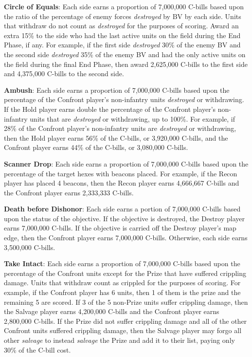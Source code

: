 \begin{description}

\item {\bfseries Circle of Equals}: Each side earns a proportion of 7,000,000 C-bills based upon the ratio of the percentage of enemy forces \emph{destroyed} by BV by each side.
Units that withdraw do not count as \emph{destroyed} for the purposes of scoring.
Award an extra 15\% to the side who had the last active units on the field during the End Phase, if any.
For example, if the first side \emph{destroyed} 30\% of the enemy BV and the second side \emph{destroyed} 35\% of the enemy BV and had the only active units on the field during the final End Phase, then award 2,625,000 C-bills to the first side and 4,375,000 C-bills to the second side.

\item {\bfseries Ambush}: Each side earns a proportion of 7,000,000 C-bills based upon the percentage of the Confront player's non-infantry units \emph{destroyed} or withdrawing.
If the Hold player earns double the percentage of the Confront player's non-infantry units that are \emph{destroyed} or withdrawing, up to 100\%.
For example, if 28\% of the Confront player's non-infantry units are \emph{destroyed} or withdrawing, then the Hold player earns 56\% of the C-bills, or 3,920,000 C-bills, and the Confront player earns 44\% of the C-bills, or 3,080,000 C-bills.

\item {\bfseries Scanner Drop}: Each side earns a proportion of 7,000,000 C-bills based upon the percentage of the target hexes with beacons placed.
For example, if the Recon player has placed 4 beacons, then the Recon player earns 4,666,667 C-bills and the Confront player earns 2,333,333 C-bills.

\item {\bfseries Death before Dishonor}: Each side earns a portion of 7,000,000 C-bills based upon the status of the objective.
If the objective is destroyed, the Destroy player earns 7,000,000 C-bills.
If the objective is carried off the Destroy player's map edge, then the Confront player earns 7,000,000 C-bills.
Otherwise, each side earns 3,500,000 C-bills.

\item {\bfseries Take Intact}: Each side earns a proportion of 7,000,000 C-bills based upon the percentage of the Confront units except for the Prize that have suffered crippling damage.
Units that withdraw count as crippled for the purposes of scoring.
For example, if the Confront player has 6 units, then 1 of them is the prize and the remaining 5 are scored.
If 3 of the 5 non-Prize units suffer crippling damage, then the Salvage player earns 4,200,000 C-bills and the Confront player earns 2,800,000 C-bills.
If the Prize did not suffer crippling damage and all of the other Confront units suffered crippling damage, then the Salvage player may forgo all other \emph{salvage} to instead \emph{salvage} the Prize and add it to their list, paying only 30\% of the C-bill cost.


\end{description}
